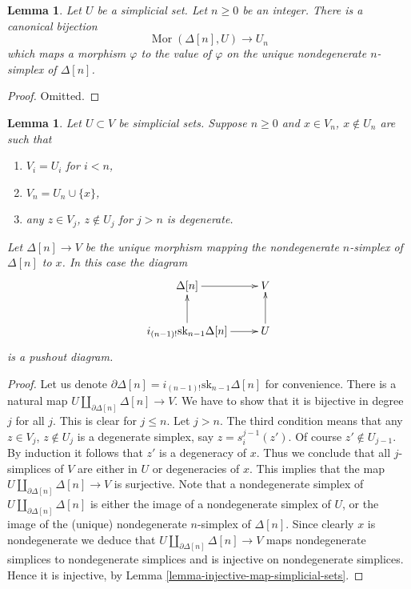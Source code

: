 \documentclass{stacks-project}
\theoremstyle{plain}
\newtheorem{lemma}[subsection]{Lemma}
\theoremstyle{definition}
\theoremstyle{remark}
\numberwithin{equation}{subsection}
\def\Mor{\mathop{\mathrm{Mor}}\nolimits}
\begin{document}
\begin{lemma}
\label{lemma-simplex-map}
Let $U$ be a simplicial set. Let $n \geq 0$ be an integer.
There is a canonical bijection
$$
\Mor(\Delta[n], U)
\longrightarrow
U_n
$$
which maps a morphism $\varphi$ to the value of $\varphi$
on the unique nondegenerate $n$-simplex of $\Delta[n]$.
\end{lemma}

\begin{proof}
Omitted.
\end{proof}

\begin{lemma}
\label{lemma-glue-simplex}
Let $U \subset V$ be simplicial sets.
Suppose $n \geq 0$ and $x \in V_n$, $x \not \in U_n$ are such that
\begin{enumerate}
\item $V_i = U_i$ for $i < n$,
\item $V_n = U_n \cup \{x\}$,
\item any $z \in V_j$, $z \not \in U_j$ for $j > n$
is degenerate.
\end{enumerate}
Let $\Delta[n] \to V$ be the unique morphism mapping the
nondegenerate $n$-simplex of $\Delta[n]$ to $x$.
In this case the diagram
$$
\xymatrix{
\Delta[n] \ar[r] & V \\
i_{(n - 1)!} \text{sk}_{n - 1} \Delta[n] \ar[r] \ar[u] & U \ar[u]
}
$$
is a pushout diagram.
\end{lemma}

\begin{proof}
Let us denote $\partial \Delta[n] = i_{(n - 1)!} \text{sk}_{n - 1} \Delta[n]$
for convenience. There is a natural map
$U \amalg_{\partial \Delta[n]} \Delta[n] \to V$.
We have to show that it is bijective in degree $j$
for all $j$. This is clear for $j \leq n$. Let $j > n$.
The third condition means that any $z \in V_j$, $z \not \in U_j$
is a degenerate simplex, say $z = s^{j - 1}_i(z')$. Of course
$z' \not \in U_{j - 1}$. By induction it follows that $z'$
is a degeneracy of $x$. Thus we conclude that all $j$-simplices
of $V$ are either in $U$ or degeneracies of $x$. This implies
that the map $U \amalg_{\partial \Delta[n]} \Delta[n] \to V$
is surjective. Note that a nondegenerate simplex of
$U \amalg_{\partial \Delta[n]} \Delta[n]$ is either
the image of a nondegenerate simplex of $U$, or
the image of the (unique) nondegenerate $n$-simplex
of $\Delta[n]$. Since clearly $x$ is nondegenerate we
deduce that $U \amalg_{\partial \Delta[n]} \Delta[n] \to V$
maps nondegenerate simplices to nondegenerate simplices
and is injective on nondegenerate simplices. Hence it is
injective, by Lemma \ref{lemma-injective-map-simplicial-sets}.
\end{proof}
\end{document}

